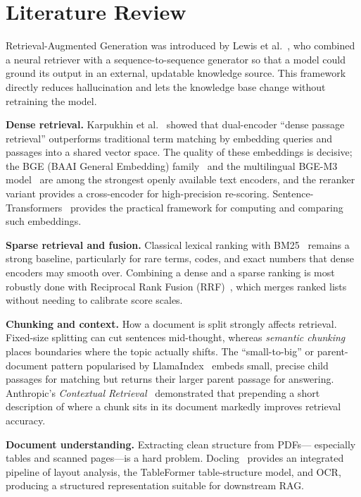\documentclass[12pt,a4paper]{report}
\begin{document}
\chapter{Literature Review}

Retrieval-Augmented Generation was introduced by Lewis et al.~\cite{ref:rag},
who combined a neural retriever with a sequence-to-sequence generator so that a
model could ground its output in an external, updatable knowledge source. This
framework directly reduces hallucination and lets the knowledge base change
without retraining the model.

\textbf{Dense retrieval.} Karpukhin et al.~\cite{ref:dpr} showed that
dual-encoder ``dense passage retrieval'' outperforms traditional term matching by
embedding queries and passages into a shared vector space. The quality of these
embeddings is decisive; the BGE (BAAI General Embedding) family~\cite{ref:bge}
and the multilingual BGE-M3 model~\cite{ref:bgem3} are among the strongest openly
available text encoders, and the reranker variant provides a cross-encoder for
high-precision re-scoring. Sentence-Transformers~\cite{ref:sbert} provides the
practical framework for computing and comparing such embeddings.

\textbf{Sparse retrieval and fusion.} Classical lexical ranking with
BM25~\cite{ref:bm25} remains a strong baseline, particularly for rare terms,
codes, and exact numbers that dense encoders may smooth over. Combining a dense
and a sparse ranking is most robustly done with Reciprocal Rank Fusion
(RRF)~\cite{ref:rrf}, which merges ranked lists without needing to calibrate
score scales.

\textbf{Chunking and context.} How a document is split strongly affects
retrieval. Fixed-size splitting can cut sentences mid-thought, whereas
\emph{semantic chunking} places boundaries where the topic actually shifts.
The ``small-to-big'' or parent-document pattern popularised by
LlamaIndex~\cite{ref:llamaindex} embeds small, precise child passages for
matching but returns their larger parent passage for answering. Anthropic's
\emph{Contextual Retrieval}~\cite{ref:contextual} demonstrated that prepending a
short description of where a chunk sits in its document markedly improves
retrieval accuracy.

\textbf{Document understanding.} Extracting clean structure from PDFs---
especially tables and scanned pages---is a hard problem. Docling~\cite{ref:docling}
provides an integrated pipeline of layout analysis, the TableFormer
table-structure model, and OCR, producing a structured representation suitable
for downstream RAG.
\end{document}

